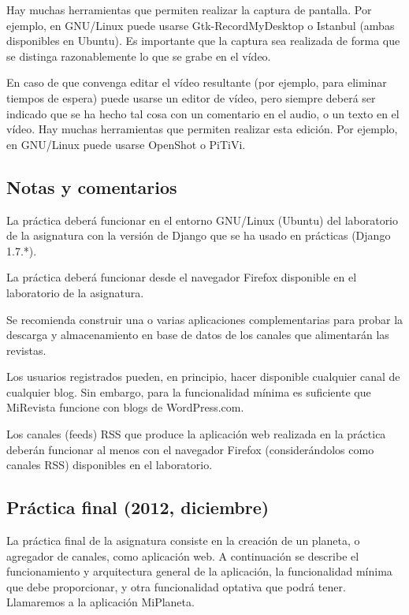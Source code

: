 Hay muchas herramientas que permiten realizar la captura de pantalla. Por ejemplo, en GNU/Linux puede usarse Gtk-RecordMyDesktop o Istanbul (ambas disponibles en Ubuntu). Es importante que la captura sea realizada de forma que se distinga razonablemente lo que se grabe en el vídeo.

En caso de que convenga editar el vídeo resultante (por ejemplo, para eliminar tiempos de espera) puede usarse un editor de vídeo, pero siempre deberá ser indicado que se ha hecho tal cosa con un comentario en el audio, o un texto en el vídeo. Hay muchas herramientas que permiten realizar esta edición. Por ejemplo, en GNU/Linux puede usarse OpenShot o PiTiVi.

\subsection{Notas y comentarios}

La práctica deberá funcionar en el entorno GNU/Linux (Ubuntu) del laboratorio de la asignatura con la versión de Django que se ha usado en prácticas (Django 1.7.*).

La práctica deberá funcionar desde el navegador Firefox disponible en el laboratorio de la asignatura.

Se recomienda construir una o varias aplicaciones complementarias para probar la descarga y almacenamiento en base de datos de los canales que alimentarán las revistas.

Los usuarios registrados pueden, en principio, hacer disponible cualquier canal de cualquier blog. Sin embargo, para la funcionalidad mínima es suficiente que MiRevista funcione con blogs de WordPress.com.

Los canales (feeds) RSS que produce la aplicación web realizada en la práctica deberán funcionar al menos con el navegador Firefox (considerándolos como canales RSS) disponibles en el laboratorio.


\subsection{Práctica final (2012, diciembre)}
\label{practica-final-2012-12}

La práctica final de la asignatura consiste en la creación de un planeta, o agregador de canales, como aplicación web. A continuación se describe el funcionamiento y arquitectura general de la aplicación, la funcionalidad mínima que debe proporcionar, y otra funcionalidad optativa que podrá tener. Llamaremos a la aplicación MiPlaneta.

